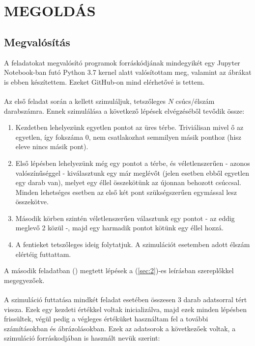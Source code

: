 \section*{\bfseries\large\MakeUppercase{Megoldás}}

\subsection{Megvalósítás}
A feladatokat megvalósító programok forráskódjának mindegyikét egy Jupyter Notebook-ban futó Python 3.7 kernel alatt valósítottam meg, valamint az ábrákat is ebben készítettem. Ezeket GitHub-on mind elérhetővé is tettem\cite{github}.
\\ \\
Az első feladat során a \rrtt kellett szimuláljuk, tetszőleges $N$ csúcs/élszám darabszámra. Ennek szimulálása a következő lépések elvégzéséből tevődik össze:

\begin{enumerate}
    \item Kezdetben lehelyezünk egyetlen pontot az üres térbe. Triviálisan mivel ő az egyetlen, így fokszáma $0$, nem csatlakozhat semmilyen másik ponthoz (hisz eleve nincs másik pont).
    \item Első lépésben lehelyezünk még egy pontot a térbe, és véletlenszerűen - azonos valószínűséggel - kiválasztunk egy már meglévőt (jelen esetben ebből egyetlen egy darab van), melyet egy éllel összekötünk az újonnan behozott csúccsal. Minden lehetséges esetben az első két pont szükségszerűen egymással lesz összekötve.
    \item Második körben szintén véletlenszerűen választunk egy pontot - az eddig meglevő 2 közül -, majd egy harmadik pontot kötünk egy éllel hozzá.
    \item A fentieket tetszőleges ideig folytatjuk. A szimulációt esetemben adott élszám elértéig futtattam.
\end{enumerate}
A második feladatban (\apm) megtett lépések a (\ref{sec:2})-es leírásban szereplőkkel megegyezőek.
\\ \\
A szimuláció futtatása mindkét feladat esetében összesen 3 darab adatsorral tért vissza. Ezek egy kezdeti értékkel voltak inicializálva, majd ezek minden lépésben frissültek, végül pedig a végleges értéküket használtam fel a további számításokban és ábrázolásokban. Ezek az adatsorok a következőek voltak, a szimuláció forráskodjában is használt nevük szerint:

